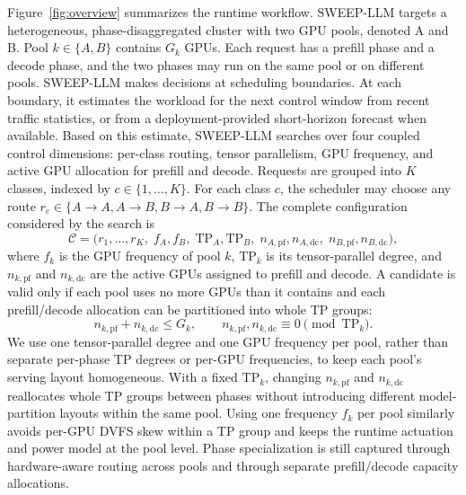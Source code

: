 Figure~\ref{fig:overview} summarizes the runtime workflow.
SWEEP-LLM targets a heterogeneous, phase-disaggregated cluster with two GPU pools, denoted A and B.
Pool $k\in\{A,B\}$ contains $G_k$ GPUs.
Each request has a prefill phase and a decode phase, and the two phases may run on the same pool or on different pools.
SWEEP-LLM makes decisions at scheduling boundaries.
At each boundary, it estimates the workload for the next control window from recent traffic statistics, or from a deployment-provided short-horizon forecast when available.
Based on this estimate, SWEEP-LLM searches over four coupled control dimensions: per-class routing, tensor parallelism, GPU frequency, and active GPU allocation for prefill and decode.
Requests are grouped into $K$ classes, indexed by $c\in\{1,\ldots,K\}$.
For each class $c$, the scheduler may choose any route $r_c \in \{A\!\to\!A, A\!\to\!B, B\!\to\!A, B\!\to\!B\}$.
The complete configuration considered by the search is
\begin{equation}
\mathcal{C} =
\bigl(
r_1,\ldots,r_K,\;
f_A,f_B,\;
\mathrm{TP}_A,\mathrm{TP}_B,\;
n_{A,\mathrm{pf}},n_{A,\mathrm{dc}},\;
n_{B,\mathrm{pf}},n_{B,\mathrm{dc}}
\bigr),
\label{eq:config}
\end{equation}
where $f_k$ is the GPU frequency of pool $k$, $\mathrm{TP}_k$ is its tensor-parallel degree, and $n_{k,\mathrm{pf}}$ and $n_{k,\mathrm{dc}}$ are the active GPUs assigned to prefill and decode.
A candidate is valid only if each pool uses no more GPUs than it contains and each prefill/decode allocation can be partitioned into whole TP groups:
\begin{equation}
n_{k,\mathrm{pf}} + n_{k,\mathrm{dc}} \le G_k,
\qquad
n_{k,\mathrm{pf}},n_{k,\mathrm{dc}} \equiv 0 \pmod{\mathrm{TP}_k}.
\label{eq:gpu_alloc_constraint}
\end{equation}
We use one tensor-parallel degree and one GPU frequency per pool, rather than separate per-phase TP degrees or per-GPU frequencies, to keep each pool's serving layout homogeneous.
With a fixed $\mathrm{TP}_k$, changing $n_{k,\mathrm{pf}}$ and $n_{k,\mathrm{dc}}$ reallocates whole TP groups between phases without introducing different model-partition layouts within the same pool.
Using one frequency $f_k$ per pool similarly avoids per-GPU DVFS skew within a TP group and keeps the runtime actuation and power model at the pool level.
Phase specialization is still captured through hardware-aware routing across pools and through separate prefill/decode capacity allocations.

